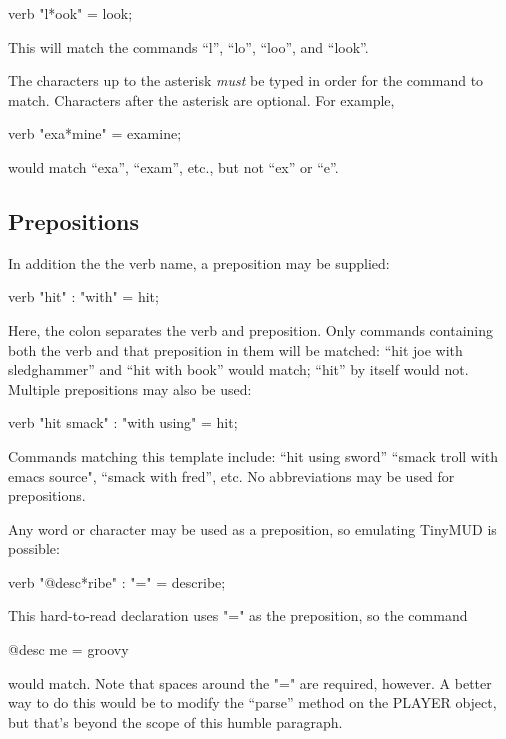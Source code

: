 \begin{code}
verb "l*ook" = look;
\end{code}

This will match the commands ``l'', ``lo'', ``loo'', and ``look''.

The characters up to the asterisk {\em must} be typed in order for
the command to match.  Characters after the asterisk are
optional.  For example,

\begin{code}
verb "exa*mine" = examine;
\end{code}

would match ``exa'', ``exam'', etc., but not ``ex'' or ``e''.

\subsection{Prepositions}

In addition the the verb name, a preposition may be supplied:

\begin{code}
verb "hit" : "with" = hit;
\end{code}

Here, the colon separates the verb and preposition.  Only commands
containing both the verb and that preposition in them will be
matched:  ``hit joe with sledghammer'' and ``hit with book'' would
match; ``hit'' by itself would not.  Multiple prepositions may
also be used:

\begin{code}
verb "hit smack" : "with using" = hit;
\end{code}

Commands matching this template include:  ``hit using sword''  ``smack
troll with emacs source", ``smack with fred'', etc.  No abbreviations
may be used for prepositions.

Any word or character may be used as a preposition, so emulating
TinyMUD is possible:

\begin{code}
verb "@desc*ribe" : "=" = describe;
\end{code}

This hard-to-read declaration uses "=" as the preposition, so the
command

\begin{code}
@desc me = groovy
\end{code}

would match.  Note that spaces around the "=" are required, however.
A better way to do this would be to modify the ``parse'' method on
the PLAYER object, but that's beyond the scope of this humble paragraph.

